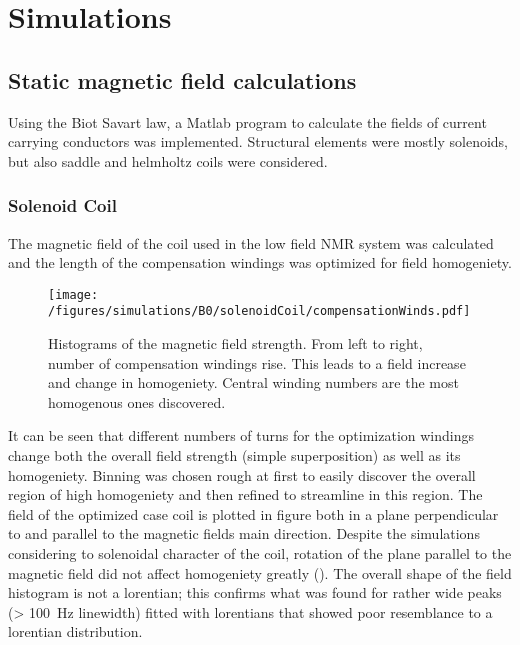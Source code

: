 \section{Simulations}
        \label{sec:results:sim}
        \subsection{Static magnetic field calculations}
        \label{sec:results:sim:B0}
            Using the Biot Savart law, a Matlab program to calculate the fields of current carrying conductors was implemented. Structural elements were mostly solenoids, but also saddle and helmholtz coils were considered.
            \subsubsection{Solenoid Coil}
            The magnetic field of the coil used in the low field NMR system was calculated and the length of the compensation windings was optimized for field homogeniety.
                \begin{figure}
                    \centering
                    \texttt{[image: /figures/simulations/B0/solenoidCoil/compensationWinds.pdf]}
                    \caption[Compensation wind optimization]{Histograms of the magnetic field strength. From left to right, number of compensation windings rise. This leads to a field increase and change in homogeniety. Central winding numbers are the most homogenous ones discovered.}
                    \label{fig:results:compensationWindOptimization}
                \end{figure}
            It can be seen that different numbers of turns for the optimization windings change both the overall field strength (simple superposition) as well as its homogeniety. Binning was chosen rough at first to easily discover the overall region of high homogeniety and then refined to streamline in this region.
            The field of the optimized case coil is plotted in figure  both in a plane perpendicular to and parallel to the magnetic fields main direction. Despite the simulations considering to solenoidal character of the coil, rotation of the plane parallel to the magnetic field did not affect homogeniety greatly (). The overall shape of the field histogram is not a lorentian; this confirms what was found for rather wide peaks (> \SI{100}{\hertz} linewidth) fitted with lorentians that showed poor resemblance to a lorentian distribution.
